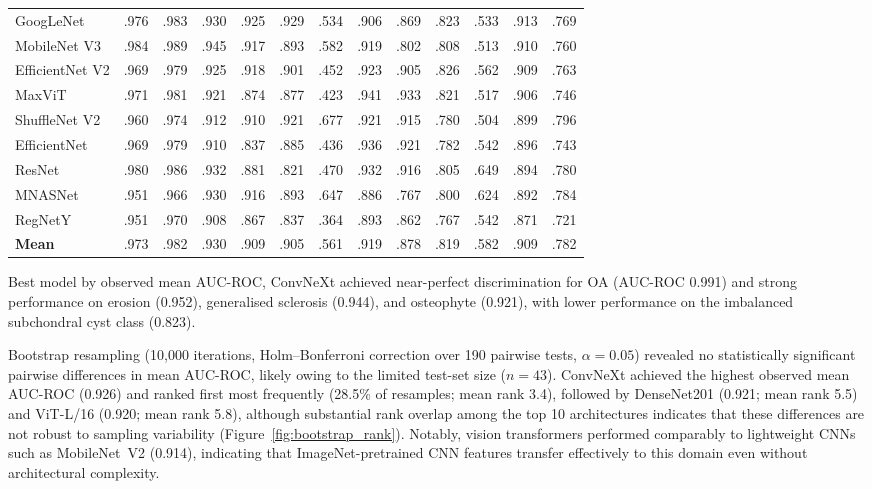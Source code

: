 \documentclass[review,12pt]{elsarticle}
\begin{document}
\begin{table}[htbp]
\begin{tabular}{l cc cc cc cc cc cc}
GoogLeNet           & .976 & .983 & .930 & .925 & .929 & .534 & .906 & .869 & .823 & .533 & .913 & .769 \\
MobileNet V3        & .984 & .989 & .945 & .917 & .893 & .582 & .919 & .802 & .808 & .513 & .910 & .760 \\
EfficientNet V2     & .969 & .979 & .925 & .918 & .901 & .452 & .923 & .905 & .826 & .562 & .909 & .763 \\
MaxViT              & .971 & .981 & .921 & .874 & .877 & .423 & .941 & .933 & .821 & .517 & .906 & .746 \\
ShuffleNet V2       & .960 & .974 & .912 & .910 & .921 & .677 & .921 & .915 & .780 & .504 & .899 & .796 \\
EfficientNet        & .969 & .979 & .910 & .837 & .885 & .436 & .936 & .921 & .782 & .542 & .896 & .743 \\
ResNet              & .980 & .986 & .932 & .881 & .821 & .470 & .932 & .916 & .805 & .649 & .894 & .780 \\
MNASNet             & .951 & .966 & .930 & .916 & .893 & .647 & .886 & .767 & .800 & .624 & .892 & .784 \\
RegNetY             & .951 & .970 & .908 & .867 & .837 & .364 & .893 & .862 & .767 & .542 & .871 & .721 \\
\midrule
\textbf{Mean}       & .973 & .982 & .930 & .909 & .905 & .561 & .919 & .878 & .819 & .582 & .909 & .782 \\
\bottomrule
\end{tabular}
\end{table}

Best model by observed mean AUC-ROC, ConvNeXt achieved near-perfect discrimination for OA
(AUC-ROC 0.991) and strong performance on erosion (0.952), generalised
sclerosis (0.944), and osteophyte (0.921), with lower performance on
the imbalanced subchondral cyst class (0.823).
 
Bootstrap resampling (10{,}000 iterations, Holm--Bonferroni correction
over 190 pairwise tests, $\alpha = 0.05$) revealed no statistically
significant pairwise differences in mean AUC-ROC, likely owing to the
limited test-set size ($n = 43$). ConvNeXt achieved the highest
observed mean AUC-ROC (0.926) and ranked first most frequently (28.5\%
of resamples; mean rank 3.4), followed by DenseNet201 (0.921; mean rank
5.5) and ViT-L/16 (0.920; mean rank 5.8), although substantial rank
overlap among the top 10 architectures indicates that these differences
are not robust to sampling variability
(Figure~\ref{fig:bootstrap_rank}). Notably, vision transformers
performed comparably to lightweight CNNs such as MobileNet~V2 (0.914),
indicating that ImageNet-pretrained CNN features transfer effectively to
this domain even without architectural complexity.
\end{document}
